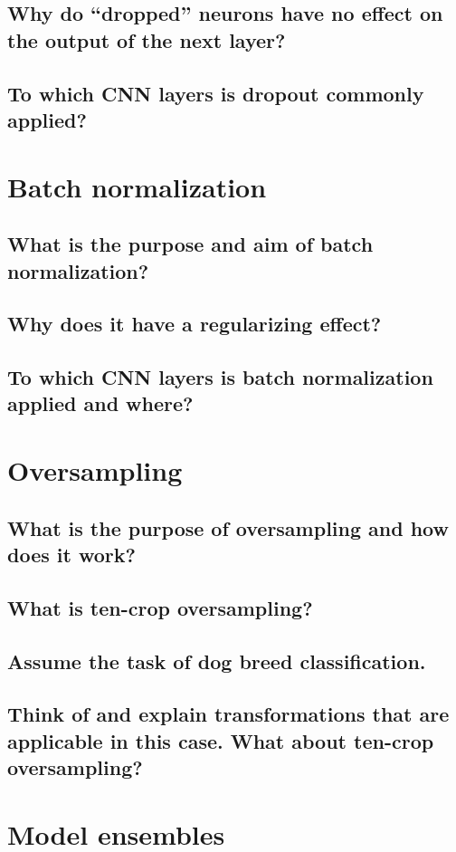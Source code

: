 \subsection{Why do “dropped” neurons have no effect on the output of the next layer?}
\subsection{To which CNN layers is dropout commonly applied?}

\section{Batch normalization}
\subsection{What is the purpose and aim of batch normalization?}
\subsection{Why does it have a regularizing effect?}
\subsection{To which CNN layers is batch normalization applied and where?}

\section{Oversampling}
\subsection{What is the purpose of oversampling and how does it work?}
\subsection{What is ten-crop oversampling?}
\subsection{Assume the task of dog breed classification.}
\subsection{Think of and explain transformations that are applicable in this case. What about ten-crop oversampling?}

\section{Model ensembles}
